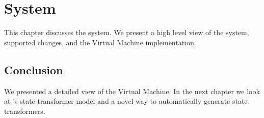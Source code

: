 
\chapter{\JV System}
\label{chap:system}

This chapter discusses the \JV system. We present a high level view of the
system, supported changes, and the \JV Virtual Machine implementation.










\section{Conclusion}
We presented a detailed view of the \JV Virtual Machine. In the next
chapter we look at \JV's state transformer model and a novel way to
automatically generate state transformers.
